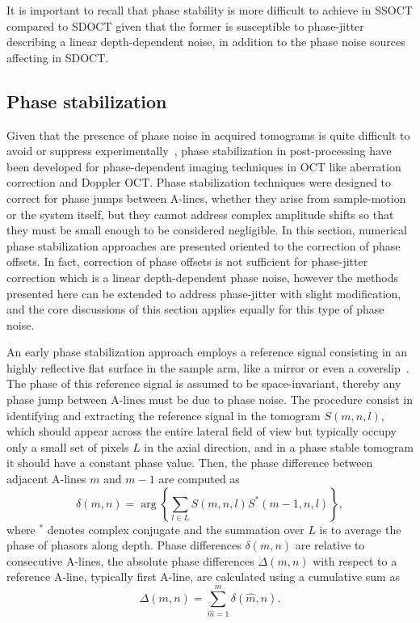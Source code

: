 It is important to recall that phase stability is more difficult to achieve in SSOCT compared to SDOCT given that the former is susceptible to phase-jitter describing a linear depth-dependent noise, in addition to the phase noise sources affecting in SDOCT.

\subsection{Phase stabilization}\label{sec:phaseStabilization}

Given that the presence of phase noise in acquired tomograms is quite difficult to avoid or suppress experimentally~\cite{Adie2015_Interferometric}, phase stabilization in post-processing have been developed for phase-dependent imaging techniques in OCT like aberration correction and Doppler OCT. Phase stabilization techniques were designed to correct for phase jumps between A-lines, whether they arise from sample-motion or the system itself, but they cannot address complex amplitude shifts so that they must be small enough to be considered negligible. In this section, numerical phase stabilization approaches are presented oriented to the correction of phase offsets. In fact, correction of phase offsets is not sufficient for phase-jitter correction which is a linear depth-dependent phase noise, however the methods presented here can be extended to address phase-jitter with slight modification, and the core discussions of this section applies equally for this type of phase noise.

An early phase stabilization approach employs a reference signal consisting in an highly reflective flat surface in the sample arm, like a mirror or even a coverslip~\cite{Ralston2006_Phase, Yang2001_Phasereferenced}. The phase of this reference signal is assumed to be space-invariant, thereby any phase jump between A-lines must be due to phase noise. The procedure consist in identifying and extracting the reference signal in the tomogram $S(m,n,l)$, which should appear across the entire lateral field of view but typically occupy only a small set of pixels $L$ in the axial direction, and in a phase stable tomogram it should have a constant phase value. Then, the phase difference between adjacent A-lines $m$ and $m-1$ are computed as
\begin{equation}\label{eq:PhaseDiff}
	\delta(m,n) = \arg\left\{\sum_{l\in L} S(m,n,l)S^*(m-1,n,l)\right\},
\end{equation}
where $^*$ denotes complex conjugate and the summation over $L$ is to average the phase of phasors along depth. Phase differences $\delta(m,n)$ are relative to consecutive A-lines, the absolute phase differences $\Delta(m,n)$ with respect to a reference A-line, typically first A-line, are calculated using a cumulative sum as
\begin{equation} \label{eq:absPhaseDiff}
	\Delta(m,n) = \sum_{\hat{m}=1}^m \delta(\hat{m},n).
\end{equation}

